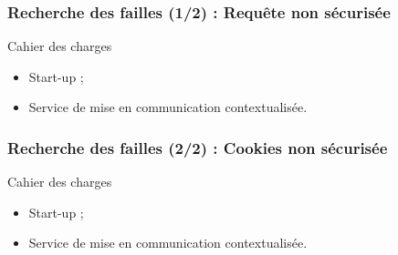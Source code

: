 \begin{frame}
	\frametitle{Recherche des failles (1/2) : Requête non sécurisée}

	\begin{block}{Cahier des charges}
	 \begin{itemize}
      \item Start-up ;
	  \item Service de mise en communication contextualisée.
	 \end{itemize}
	\end{block}
\end{frame}

\begin{frame}
	\frametitle{Recherche des failles (2/2) : Cookies non sécurisée}

	\begin{block}{Cahier des charges}
	 \begin{itemize}
      \item Start-up ;
	  \item Service de mise en communication contextualisée.
	 \end{itemize}
	\end{block}
\end{frame}